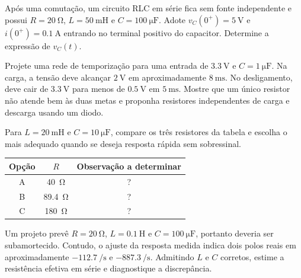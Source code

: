 \begin{questao}[4]{}

Após uma comutação, um circuito RLC em série fica sem fonte independente e possui
$R=\SI{20}{\ohm}$, $L=\SI{50}{\milli\henry}$ e
$C=\SI{100}{\micro\farad}$. Adote $v_C(0^+)=\SI{5}{\volt}$ e
$i(0^+)=\SI{0.1}{\ampere}$ entrando no terminal positivo do capacitor. Determine
a expressão de $v_C(t)$.


\end{questao}
\begin{questao}[4]{}

Projete uma rede de temporização para uma entrada de $\SI{3.3}{\volt}$ e
$C=\SI{1}{\micro\farad}$. Na carga, a tensão deve alcançar
$\SI{2}{\volt}$ em aproximadamente $\SI{8}{\milli\second}$. No desligamento,
deve cair de $\SI{3.3}{\volt}$ para menos de $\SI{0.5}{\volt}$ em
$\SI{5}{\milli\second}$. Mostre que um único resistor não atende bem às duas
metas e proponha resistores independentes de carga e descarga usando um diodo.


\end{questao}
\begin{questao}[4]{}

Para $L=\SI{20}{\milli\henry}$ e $C=\SI{10}{\micro\farad}$, compare os três
resistores da tabela e escolha o mais adequado quando se deseja resposta rápida
sem sobressinal.

\begin{table}[H]
\centering\small\sffamily
\begin{tabular}{@{}c c c@{}}
\toprule
\textbf{Opção} & $R$ & \textbf{Observação a determinar}\\
\midrule
A & \SI{40}{\ohm} & ?\\
B & \SI{89.4}{\ohm} & ?\\
C & \SI{180}{\ohm} & ?\\
\bottomrule
\end{tabular}
\end{table}



\end{questao}
\begin{questao}[4]{}

Um projeto prevê $R=\SI{20}{\ohm}$, $L=\SI{0.1}{\henry}$ e
$C=\SI{100}{\micro\farad}$, portanto deveria ser subamortecido. Contudo, o ajuste
da resposta medida indica dois polos reais em aproximadamente
$-\SI{112.7}{\per\second}$ e $-\SI{887.3}{\per\second}$. Admitindo $L$ e $C$
corretos, estime a resistência efetiva em série e diagnostique a discrepância.


\end{questao}
